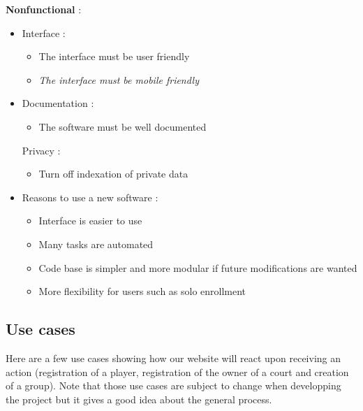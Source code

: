 \documentclass[a4paper, 12pt]{article}
\begin{document}
\textbf{Nonfunctional} :
\begin{itemize}


	\item Interface :
	
	\begin{itemize}
		\item The interface must be user friendly
		\item \textit{The interface must be mobile friendly}
	\end{itemize}

	\item Documentation :
	
	\begin{itemize}
		\item The software must be well documented

	\end{itemize}
	
    Privacy :
    
    \begin{itemize}
    	\item Turn off indexation of private data

    \end{itemize}



\item Reasons to use a new software :


	\begin{itemize}
		\item Interface is easier to use
		\item Many tasks are automated
		\item Code base is simpler and more modular if future modifications are wanted
		\item More flexibility for users such as solo enrollment
	\end{itemize}

\end{itemize}


\subsection{Use cases}

Here are a few use cases showing how our website will react upon receiving an action (registration of a player, registration of the owner of a court and creation of a group). Note that those use cases are subject to change when developping the project but it gives a good idea about the general process.\\
\end{document}
